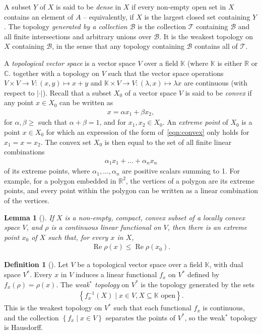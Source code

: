 \documentclass[11pt,a4paper]{report}
\theoremstyle{plain}
\newtheorem{lemma}{Lemma}
\theoremstyle{definition}
\newtheorem*{defn*}{Definition}
\newcommand{\1}{\mathbbm{1}}
\newcommand{\C}{\mathbb{C}}
\newcommand{\R}{\mathbb{R}}
\newcommand{\B}{\mathcal{B}}
\newcommand{\T}{\mathcal{T}}
\DeclareMathOperator{\Real}{\operatorname{Re}}
\begin{document}
A subset $Y$ of $X$ is said to be \emph{dense} in $X$ if every non-empty open set 
in $X$ contains an element of $A$ -- equivalently, if $X$ is the largest closed 
set containing $Y$. The topology \emph{generated by a collection $\B$} is the 
collection $\T$ containing $\B$ and all finite intersections and arbitrary 
unions over $\B$. It is the weakest topology on $X$ containing $\B$, in the 
sense that any topology containing $\B$ contains all of $\T$.

A \emph{topological vector space} is a vector space $V$ over a field 
$\mathbb{K}$ (where $\mathbb{K}$ is either $\R$ or $\C$.
together with a topology on $V$ such that the vector space operations $V\times 
V\to V:(x,y)\mapsto x+y$ and $\mathbb{K}\times V\to V:(\lambda,x)\mapsto \lambda 
x$ are continuous (with respect to $\left|\cdot\right|$). 
Recall that a subset $X_0$ of a vector space $V$ is said to be 
\emph{convex} if any point $x \in X_0$ can be written as 
\begin{align}\label{eqn:convex}
	x = \alpha x_1 +\beta x_2,
\end{align}
for $\alpha,\beta\geq$ such that $\alpha+\beta=1$, and for $x_1,x_2\in X_0$.
An \emph{extreme point} of $X_0$ is a point $x \in X_0$ for which an expression 
of the form of~\eqref{eqn:convex} only holds for $x_1 = x = x_2$.
The convex set $X_0$ is then equal to the set of all  finite linear combinations
\begin{align*}
	\alpha_1 x_1+\dots +\alpha_n x_n
\end{align*}
of its extreme points, where $\alpha_1,\dots,\alpha_n$ are positive scalars 
summing to 1. For example, for a polygon embedded in $\R^2$, the vertices of a 
polygon are its extreme points, and every point within the polygon can be 
written as a linear combination of the vertices.


\begin{lemma}[{\cite[1.4.4]{kadison83}}]\label{lemma:144}
If $X$ is a non-empty, compact, convex subset of a locally convex space $V$, and 
$\rho$ is a continuous linear functional on $V$, then there is an extreme point 
$x_0$ of $X$ such that, for every $x$ in $X$,
	\begin{align*}
		\Real\rho(x) \leq \Real\rho(x_0).
	\end{align*}
\end{lemma}

\begin{defn*}[{\cite[3.14]{rudin91}}]
	Let $V$ be a topological vector space over a field $\mathbb K$, with dual 
	space $V^\ast$. Every $x$ in $V$ induces a linear functional $f_x$ on $V^\ast$ 
	defined by $f_x(\rho)=\rho(x)$. The \emph{weak$^\ast$ topology} on $V^\ast$ is 
	the topology generated by the sets 
	\begin{align*}
		\left\{f^{-1}_x(X) \mid x \in V, X\subseteq \mathbb K \mbox{ open}\right\}.
	\end{align*}
	This is the weakest topology on $V^\ast$ such that each functional $f_x$ is 
	continuous, and the collection $\left\{f_x \mid x\in V\right\}$ separates the 
	points of $V^\ast$, so the weak$^\ast$ topology is Hausdorff.
\end{defn*}
\end{document}

